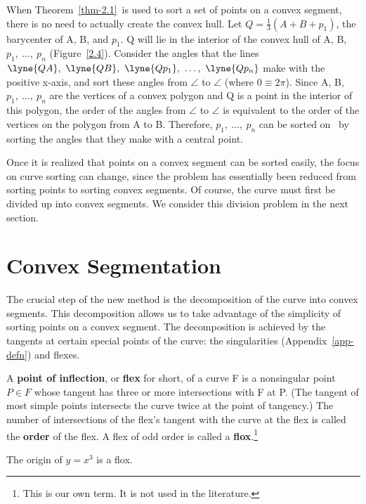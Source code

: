 When Theorem~\ref{thm-2.1}\ is used to sort a 
set of points on a convex segment,
there is no need to actually create the convex hull.
Let \mbox{$Q = \frac{1}{3}(A+B+p_{1})$},
the barycenter of A, B, and $p_{1}$.
Q will lie in the interior of the convex hull of 
A, B, $p_{1},\ \ldots,\ p_{n}$ (Figure~\ref{2.4}).
Consider the angles that the lines $,\ \lyne{QB},\ 
\lyne{Qp_{1}},\ \ldots,\ \lyne{Qp_{n}}$ make with the positive x-axis, and
sort these angles from $\angle$\lyne{QA} to $\angle$\lyne{QB}
(where $0 \equiv 2\pi$).
Since A, B, $p_{1},\ \ldots,\ p_{n}$ are the vertices of a convex polygon
and Q is a point in the interior of this polygon, the order of the angles
from $\angle$\lyne{QA} to $\angle$\lyne{QB} is equivalent to the order of the
vertices on the polygon from A to B.
Therefore, $p_{1},\ \ldots,\ p_{n}$ can be sorted on \ by sorting
the angles that they make with a central point.


Once it is realized that points on a convex segment can be sorted easily,
the focus on curve sorting can change,
since the problem has essentially been reduced from sorting points to sorting
convex segments.
Of course, the curve must first be divided up into convex segments.
We consider this division problem in the next section.
%
\section{Convex Segmentation}
\label{sec-divide}

The crucial step of the new method is the decomposition of the curve
into convex segments.
This decomposition allows us to take advantage of the simplicity of sorting
points on a convex segment.
The decomposition is achieved by the tangents at certain special 
points of the curve: the singularities (Appendix~\ref{app-defn}) and flexes.

\begin{definition}
A {\bf point of inflection}, or {\bf flex} for short,
of a curve F is a nonsingular point $P \in F$ whose tangent
has three or more intersections with F at P.
(The tangent of most simple points 
intersects the curve twice at the point of tangency.)
The number of intersections of the flex's tangent with the curve at the 
flex is called the {\bf order} of the flex.
A flex of odd order is called a {\bf flox}.\footnote{This is our own term.
It is not used in the literature.}
\end{definition}
%
\begin{example}
The origin of \(y = x^3\) is a flox.
\end{example}


